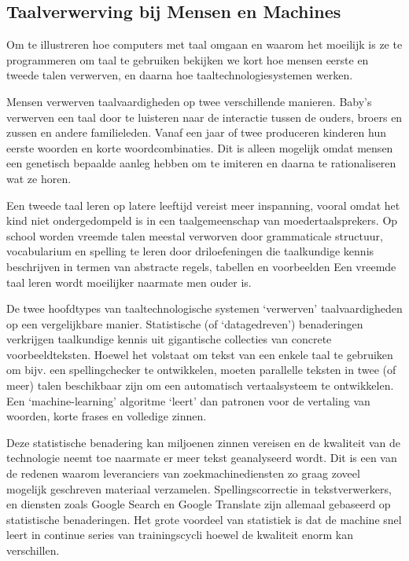 \documentclass[]{../../metanetpaper}
\begin{document}
\begin{multicols}{2}
\subsection{Taalverwerving bij Mensen en Machines}

 Om te illustreren hoe computers met taal omgaan en waarom het moeilijk is ze te programmeren om taal te gebruiken bekijken we kort hoe mensen eerste en tweede talen verwerven, en daarna hoe taaltechnologiesystemen werken.


 Mensen verwerven taalvaardigheden op twee verschillende manieren. Baby's verwerven een taal door te luisteren naar de interactie tussen de ouders, broers en zussen en andere familieleden. Vanaf een jaar of twee produceren kinderen hun eerste woorden en korte woordcombinaties. Dit is alleen mogelijk omdat mensen een genetisch bepaalde aanleg hebben om te imiteren en daarna te rationaliseren wat ze horen.

    Een tweede taal leren op latere leeftijd vereist meer inspanning, vooral omdat het kind niet ondergedompeld is in een taalgemeenschap van moedertaalsprekers. Op school worden vreemde talen meestal verworven door grammaticale structuur, vocabularium en spelling te leren door driloefeningen die taalkundige kennis beschrijven in termen van abstracte regels, tabellen en voorbeelden Een vreemde taal leren wordt moeilijker naarmate men ouder is.

    De twee hoofdtypes van taaltechnologische systemen `verwerven' taalvaardigheden op een vergelijkbare manier. Statistische (of `datagedreven') benaderingen verkrijgen taalkundige kennis uit gigantische collecties van concrete voorbeeldteksten. Hoewel het volstaat om tekst van een enkele taal te gebruiken om bijv. een spellingchecker te ontwikkelen, moeten parallelle teksten in twee (of meer) talen beschikbaar zijn om een automatisch vertaalsysteem te ontwikkelen. Een `machine-learning' algoritme `leert' dan patronen voor de vertaling van woorden, korte frases en volledige zinnen.

    Deze statistische benadering kan miljoenen zinnen vereisen en de kwaliteit van de technologie neemt toe naarmate er meer tekst geanalyseerd wordt. Dit is een van de redenen waarom leveranciers van zoekmachinediensten zo graag zoveel mogelijk geschreven materiaal verzamelen. Spellingscorrectie in tekstverwerkers, en diensten zoals Google Search en Google Translate zijn allemaal gebaseerd op statistische benaderingen. Het grote voordeel van statistiek is dat de machine snel leert in continue series van trainingscycli hoewel de kwaliteit enorm kan verschillen.


\end{multicols}
\end{document}
